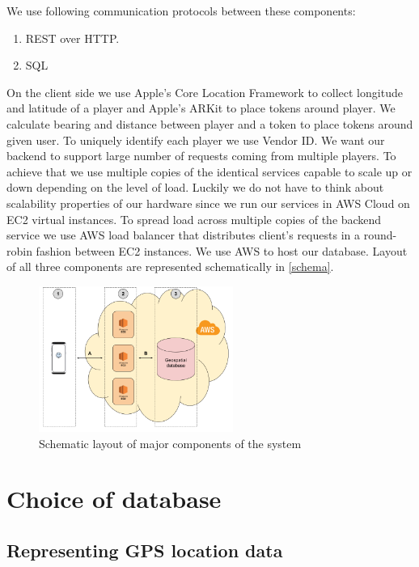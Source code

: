 \documentclass[conference]{IEEEtran}
\begin{document}
We use following communication protocols between these components:

\begin{enumerate}[label=\Alph*]
\item REST over HTTP. 
\item SQL 
\end{enumerate}

On the client side we use Apple’s Core Location Framework to collect longitude and latitude of a player and Apple’s ARKit to place tokens around player. We calculate bearing and distance between player and a token to place tokens around given user. To uniquely identify each player we use Vendor ID.
We want our backend to support large number of requests coming from multiple players. To achieve that we use multiple copies of the identical services capable to scale up or down depending on the level of load. Luckily we do not have to think about scalability properties of our hardware since we run our services in AWS Cloud on EC2 virtual instances.  To spread load across multiple copies of the backend service we use AWS load balancer that distributes client’s requests in a round-robin fashion between EC2 instances. 
We use AWS to host our database. 
Layout of all three components are represented schematically in \autoref{schema}. 

\begin{figure}
\centering
\includegraphics[width=2.5in]{imgs/systemschema.png}
\caption{Schematic layout of major components of the system}
\label{schema}
\end{figure}

\section{Choice of database}
\subsection{Representing GPS location data}
\end{document}

